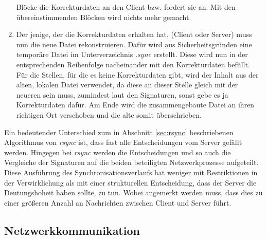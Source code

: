 \begin{enumerate}
      Blöcke die Korrekturdaten an den Client bzw. fordert sie an. Mit den übereinstimmenden Blöcken wird nichts mehr gemacht.
\item Der jenige, der die Korrekturdaten erhalten hat, (Client oder Server) muss nun die neue Datei rekonstruieren. Dafür wird aus Sicherheitsgründen eine 
      temporäre Datei im Unterverzeichnis \textit{.sync} erstellt. Diese wird nun in der entsprechenden Reihenfolge nacheinander mit den Korrekturdaten 
      befüllt. Für die Stellen, für die es keine Korrekturdaten gibt, wird der Inhalt aus der alten, lokalen Datei verwendet, da diese an dieser Stelle gleich 
      mit der neueren sein muss, zumindest laut den Signaturen, sonst gebe es ja Korrekturdaten dafür. Am Ende wird die zusammengebaute Datei an ihren 
      richtigen Ort verschoben und die alte somit überschrieben.
\end{enumerate}

Ein bedeutender Unterschied zum in Abschnitt \ref{sec:rsync} beschriebenen Algorithmus von \textit{rsync} ist, dass fast alle Entscheidungen vom Server
gefällt werden. Hingegen bei \textit{rsync} werden die Entscheidungen und so auch die Vergleiche der Signaturen auf die beiden beteiligten 
Netzwerkprozesse aufgeteilt. Diese Ausführung des Synchronisationsverlaufs hat weniger mit Restriktionen in der Verwirklichung als mit
einer strukturellen Entscheidung, dass der Server die Deutungshoheit haben sollte, zu tun. Wobei angemerkt werden muss, dass dies zu einer größeren
Anzahl an Nachrichten zwischen Client und Server führt.

\subsection{Netzwerkkommunikation}
\label{sec:netzwerkkom}

